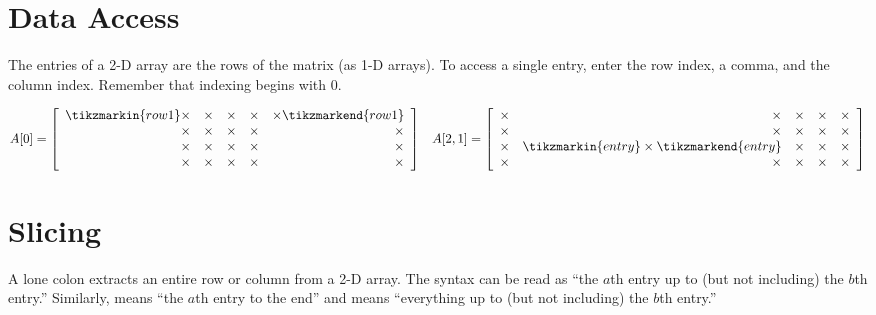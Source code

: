 \label{appendix:numpy-visual-guide}

\section*{Data Access} %

The entries of a 2-D array are the rows of the matrix (as 1-D arrays).
To access a single entry, enter the row index, a comma, and the column index.
Remember that indexing begins with $0$.

\begin{align*}
A[0] = \left[\begin{array}{rrrrr}
\tikzmarkin{row1}\times & \times & \times & \times & \times\tikzmarkend{row1}\\
\times & \times & \times & \times & \times\\
\times & \times & \times & \times & \times\\
\times & \times & \times & \times & \times\\
\end{array}\right]
&&
A[2,1] = \left[\begin{array}{rrrrr}
\times & \times & \times & \times & \times\\
\times & \times & \times & \times & \times\\
\times & \tikzmarkin{entry} \times \tikzmarkend{entry} & \times & \times & \times\\
\times & \times & \times & \times & \times
\end{array}\right]
\end{align*}

\section*{Slicing} %

A lone colon extracts an entire row or column from a 2-D array.
The syntax \li{[a:b]} can be read as ``the $a$th entry up to (but not including) the $b$th entry.''
Similarly, \li{[a:]} means ``the $a$th entry to the end'' and \li{[:b]} means ``everything up to (but not including) the $b$th entry.''

